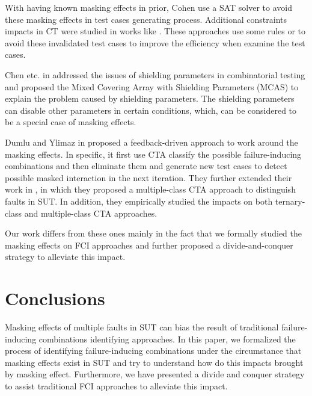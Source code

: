 \documentclass{sig-alternate}
\begin{document}
With having known masking effects in prior, Cohen \cite{cohen2008constructing} use a SAT solver to avoid these masking effects in test cases generating process. Additional constraints impacts in CT were studied in works like \cite{bryce2006prioritized,calvagna2008logic,grindal2006handling,yilmaz2013test}. These approaches use some rules or to avoid these invalidated test cases to improve the efficiency when examine the test cases.

Chen etc. in \cite{chen2010combinatorial} addressed the issues of shielding parameters in combinatorial testing  and proposed the Mixed Covering Array with Shielding Parameters (MCAS) to explain the problem caused by shielding parameters. The shielding parameters can disable other parameters in certain conditions, which, can be considered to be a special case of masking effects. 

Dumlu and Ylimaz in \cite{dumlu2011feedback} proposed a feedback-driven approach to work around the masking effects. In specific, it first use CTA classify the possible failure-inducing combinations and then eliminate them and generate new test cases to detect possible masked interaction in the next iteration. They further extended their work in \cite{yilmaz2013reducing}, in which they proposed a multiple-class CTA approach to distinguish faults in SUT. In addition, they empirically studied the impacts on both ternary-class and multiple-class CTA approaches.

Our work differs from these ones mainly in the fact that we formally studied the masking effects on FCI approaches and further proposed a divide-and-conquer strategy to alleviate this impact.

\section{Conclusions}
Masking effects of multiple faults in SUT can bias the result of traditional failure-inducing combinations identifying approaches. In this paper, we formalized the process of identifying failure-inducing combinations under the circumstance that masking effects exist in SUT and try to understand how do this impacts brought by masking effect. Furthermore, we have presented a divide and conquer strategy to assist traditional FCI approaches to alleviate this impact.

\end{document}
